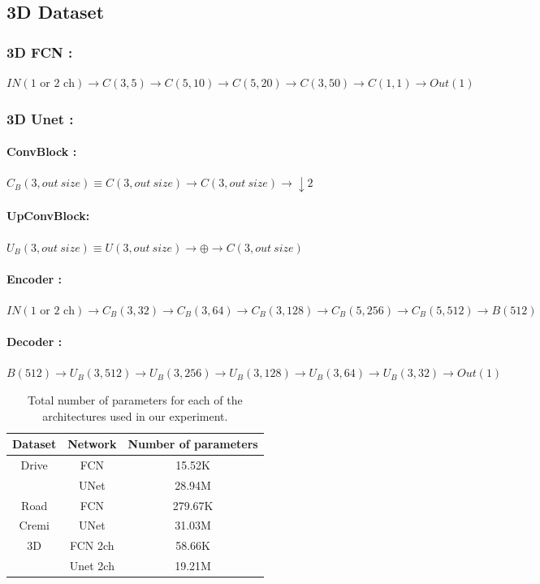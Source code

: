\subsection{3D Dataset }
\subsubsection{3D FCN :}
$IN(\mbox{1 or 2 ch})\rightarrow C(3,5)\rightarrow C(5,10) \rightarrow C(5,20)\rightarrow C(3,50)\rightarrow C(1,1)\rightarrow Out(1)$
\subsubsection{3D Unet :}
\paragraph{ConvBlock :} $C_B(3, out~size)\equiv C(3,out~size)\rightarrow C(3,out~size)\rightarrow \downarrow 2$
\paragraph{UpConvBlock:} $U_B(3, out~size)\equiv U(3,out~size)\rightarrow \oplus\rightarrow C(3,out~size)$
\paragraph{Encoder :}
$IN(\mbox{1 or 2 ch})\rightarrow C_B(3,32)\rightarrow C_B(3,64) \rightarrow C_B(3,128)\rightarrow C_B(5,256)\rightarrow C_B(5,512)\rightarrow B(512)$
\paragraph{Decoder :}
$B(512)\rightarrow U_B(3,512) \rightarrow U_B(3,256)\rightarrow U_B(3,128) \rightarrow U_B(3,64)\rightarrow U_B(3,32)\rightarrow Out(1)$


\begin{table}[ht!]
\centering
\caption{Total number of parameters for each of the architectures used in our experiment.}
\begin{tabular}{ccc}
\hline
Dataset & Network & Number of parameters \\
\hline
\hline
Drive   & FCN     & 15.52K               \\
        & UNet    & 28.94M               \\
        \hline
Road    & FCN      & 279.67K              \\
\hline
Cremi    & UNet      & 31.03M              \\
\hline
3D      & FCN 2ch    & 58.66K               \\
        & Unet 2ch    & 19.21M             \\
\hline
\end{tabular}
\end{table}





